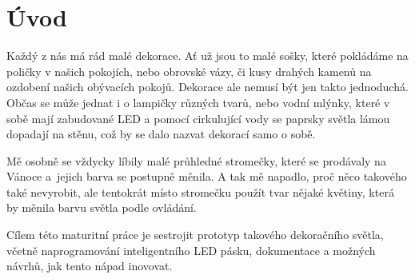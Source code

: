\chapter*{Úvod}
Každý z nás má rád malé dekorace. Ať už jsou to malé sošky, které pokládáme na poličky v našich pokojích, nebo obrovské vázy, či kusy drahých kamenů na ozdobení našich obývacích pokojů. Dekorace ale nemusí být jen takto jednoduchá. Občas se může jednat i o lampičky různých tvarů, nebo vodní mlýnky, které v sobě mají zabudované LED a pomocí cirkulující vody se paprsky světla lámou dopadají na stěnu, což by se dalo nazvat dekorací samo o sobě.

Mě osobně se vždycky líbily malé průhledné stromečky, které se prodávaly na Vánoce a~jejich barva se postupně měnila. A tak mě napadlo, proč něco takového také nevyrobit, ale tentokrát místo stromečku použít tvar nějaké květiny, která by měnila barvu světla podle ovládání. %


Cílem této maturitní práce je sestrojit prototyp takového dekoračního světla, včetně naprogramování inteligentního LED pásku, dokumentace a možných návrhů, jak tento nápad inovovat.






